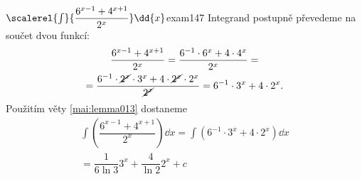 \begin{mathexam}{\(\scalerel{\int}{\dfrac{6^{x-1} + 4^{x+1}}{2^x}}\dd{x}\)}{exam147} 
  Integrand postupně převedeme na součet dvou funkcí:
  \begin{multline*}
    \dfrac{6^{x-1} + 4^{x+1}}{2^x} = \dfrac{6^{-1}\cdot6^x + 4\cdot4^x}{2^x} =   \\
      = \dfrac{6^{-1}\cdot\cancel{2^x}\cdot3^x + 4\cdot\cancel{2^x}\cdot2^x}{\cancel{2^x}} 
      = 6^{-1}\cdot3^x + 4\cdot2^x. 
  \end{multline*}
  Použitím věty \ref{mai:lemma013} dostaneme
  \begin{multline*}
    \int\left(\dfrac{6^{x-1}+4^{x+1}}{2^x}\right)\dd{x} = \int(6^{-1}\cdot3^x + 4\cdot2^x)\dd{x} \\
      = \dfrac{1}{6\ln3}3^x + \dfrac{4}{\ln2}2^x + c
  \end{multline*}
\end{mathexam}